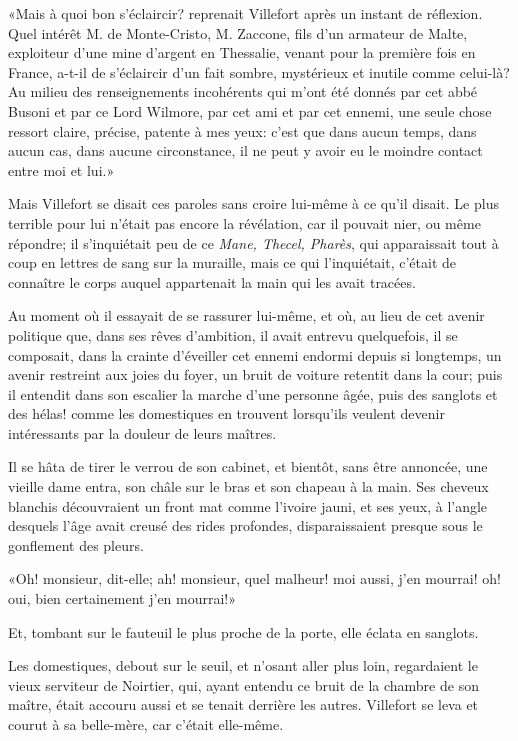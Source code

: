 «Mais à quoi bon s'éclaircir? reprenait Villefort après un instant de réflexion. Quel intérêt M. de Monte-Cristo, M. Zaccone, fils d'un armateur de Malte, exploiteur d'une mine d'argent en Thessalie, venant pour la première fois en France, a-t-il de s'éclaircir d'un fait sombre, mystérieux et inutile comme celui-là? Au milieu des renseignements incohérents qui m'ont été donnés par cet abbé Busoni et par ce Lord Wilmore, par cet ami et par cet ennemi, une seule chose ressort claire, précise, patente à mes yeux: c'est que dans aucun temps, dans aucun cas, dans aucune circonstance, il ne peut y avoir eu le moindre contact entre moi et lui.» 

Mais Villefort se disait ces paroles sans croire lui-même à ce qu'il disait. Le plus terrible pour lui n'était pas encore la révélation, car il pouvait nier, ou même répondre; il s'inquiétait peu de ce \textit{Mane, Thecel, Pharès}, qui apparaissait tout à coup en lettres de sang sur la muraille, mais ce qui l'inquiétait, c'était de connaître le corps auquel appartenait la main qui les avait tracées. 

Au moment où il essayait de se rassurer lui-même, et où, au lieu de cet avenir politique que, dans ses rêves d'ambition, il avait entrevu quelquefois, il se composait, dans la crainte d'éveiller cet ennemi endormi depuis si longtemps, un avenir restreint aux joies du foyer, un bruit de voiture retentit dans la cour; puis il entendit dans son escalier la marche d'une personne âgée, puis des sanglots et des hélas! comme les domestiques en trouvent lorsqu'ils veulent devenir intéressants par la douleur de leurs maîtres. 

Il se hâta de tirer le verrou de son cabinet, et bientôt, sans être annoncée, une vieille dame entra, son châle sur le bras et son chapeau à la main. Ses cheveux blanchis découvraient un front mat comme l'ivoire jauni, et ses yeux, à l'angle desquels l'âge avait creusé des rides profondes, disparaissaient presque sous le gonflement des pleurs. 

«Oh! monsieur, dit-elle; ah! monsieur, quel malheur! moi aussi, j'en mourrai! oh! oui, bien certainement j'en mourrai!» 

Et, tombant sur le fauteuil le plus proche de la porte, elle éclata en sanglots. 

Les domestiques, debout sur le seuil, et n'osant aller plus loin, regardaient le vieux serviteur de Noirtier, qui, ayant entendu ce bruit de la chambre de son maître, était accouru aussi et se tenait derrière les autres. Villefort se leva et courut à sa belle-mère, car c'était elle-même. 

